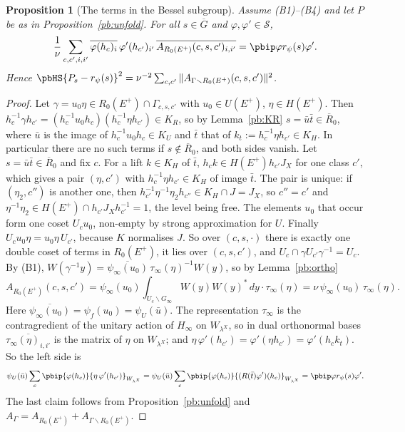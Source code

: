 \documentclass[10pt]{amsart}
\newtheorem{proposition}[theorem]{Proposition}
\theoremstyle{definition}
\theoremstyle{remark}
\providecommand{\auG}{\overline G}
\providecommand{\auS}{\mathcal S}
\providecommand{\aubar}[1]{\overline{#1}}
\providecommand{\pbR}{\overline R_0}
\providecommand{\pbrpsi}{r_\psi}
\begin{document}
\begin{proposition}[The terms in the Bessel subgroup]\label{pb:besselterms}
Assume \textup{(B1)--(B4)} and let $P$ be as in Proposition~\ref{pb:unfold}. For all $s\in\auG$ and
$\varphi,\varphi'\in\auS$,
\[
\frac1\nu\sum_{c,c',i,i'}\aubar{\varphi(h_c)_i}\,\varphi'(h_{c'})_{i'}\,\aubar{A_{R_0(E^+)}(c,s,c')_{
i,i'}}=\pbip\varphi{\pbrpsi(s)\varphi'} .
\]
Hence $\pbHS{P_s-\pbrpsi(s)}^2=\nu^{-2}\sum_{c,c'}\|A_{\Gamma\smallsetminus R_0(E^+)}(c,s,c')\|^2$.
\end{proposition}
\begin{proof}
Let $\gamma=u_0\eta\in R_0(E^+)\cap\Gamma_{c,s,c'}$ with $u_0\in U(E^+)$, $\eta\in H(E^+)$. Then
$h_c^{-1}\gamma h_{c'}=(h_c^{-1}u_0h_c)(h_c^{-1}\eta h_{c'})\in K_R$, so by Lemma~\ref{pb:KR}
$s=\bar u\bar t\in\pbR$, where $\bar u$ is the image of $h_c^{-1}u_0h_c\in K_U$ and $\bar t$ that
of $k_t:=h_c^{-1}\eta h_{c'}\in K_H$. In particular there are no such terms if $s\notin\pbR$, and
both sides vanish. Let $s=\bar u\bar t\in\pbR$ and fix $c$. For a lift $k\in K_H$ of $\bar t$, $h_ck\in H(E^+)h_{c'}
J_X$ for one class $c'$, which gives a pair $(\eta,c')$ with $h_c^{-1}\eta h_{c'}\in K_H$ of image
$\bar t$. The pair is unique: if $(\eta_2,c'')$ is another one, then $h_{c'}^{-1}\eta^{-1}\eta_2h_{
c''}\in K_H\cap J=J_X$, so $c''=c'$ and $\eta^{-1}\eta_2\in H(E^+)\cap h_{c'}J_Xh_{c'}^{-1}=1$, the
level being free. The elements $u_0$ that occur form one coset
$U_cu_0$, non-empty by strong approximation for $U$. Finally $U_cu_0\eta=u_0\eta\,U_{c'}$, because
$K$ normalises $J$. So over $(c,s,\cdot)$ there is exactly one double coset of terms in
$R_0(E^+)$, it lies over $(c,s,c')$, and $U_c\cap\gamma U_{c'}\gamma^{-1}=U_c$. By (B1),
$W(\gamma^{-1}y)=\aubar{\psi_\infty(u_0)}\,\tau_\infty(\eta)^{-1}W(y)$, so by Lemma~\ref{pb:ortho}
\[
A_{R_0(E^+)}(c,s,c')=\psi_\infty(u_0)\int_{U_c\backslash G_\infty}W(y)W(y)^*\,dy\cdot\tau_\infty(\eta)
=\nu\,\psi_\infty(u_0)\,\tau_\infty(\eta) .
\]
Here $\aubar{\psi_\infty(u_0)}=\psi_f(u_0)=\psi_U(\bar u)$. The representation $\tau_\infty$ is
the contragredient of the unitary action of $H_\infty$ on $W_{\lambda^X}$, so in dual orthonormal
bases $\aubar{\tau_\infty(\eta)_{i,i'}}$ is the matrix of $\eta$ on $W_{\lambda^X}$; and $\eta\,
\varphi'(h_{c'})=\varphi'(\eta h_{c'})=\varphi'(h_ck_t)$. So the left side is
\[
\psi_U(\bar u)\sum_c\pbip{\varphi(h_c)}{\eta\,\varphi'(h_{c'})}_{W_{\lambda^X}}=\psi_U
(\bar u)\sum_c\pbip{\varphi(h_c)}{(R(\bar t)\varphi')(h_c)}_{W_{\lambda^X}}=\pbip\varphi{\pbrpsi(s)
\varphi'} .
\]
The last claim follows from Proposition~\ref{pb:unfold} and $A_\Gamma=A_{R_0(E^+)}+A_{\Gamma
\smallsetminus R_0(E^+)}$.
\end{proof}
\end{document}
